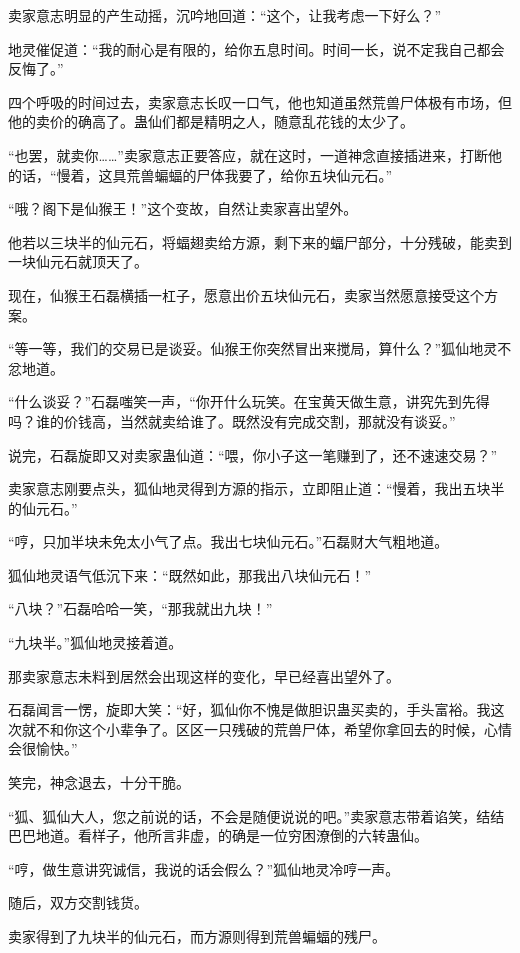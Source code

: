 \begin{this_body}
卖家意志明显的产生动摇，沉吟地回道：“这个，让我考虑一下好么？”

地灵催促道：“我的耐心是有限的，给你五息时间。时间一长，说不定我自己都会反悔了。”

四个呼吸的时间过去，卖家意志长叹一口气，他也知道虽然荒兽尸体极有市场，但他的卖价的确高了。蛊仙们都是精明之人，随意乱花钱的太少了。

“也罢，就卖你……”卖家意志正要答应，就在这时，一道神念直接插进来，打断他的话，“慢着，这具荒兽蝙蝠的尸体我要了，给你五块仙元石。”

“哦？阁下是仙猴王！”这个变故，自然让卖家喜出望外。

他若以三块半的仙元石，将蝠翅卖给方源，剩下来的蝠尸部分，十分残破，能卖到一块仙元石就顶天了。

现在，仙猴王石磊横插一杠子，愿意出价五块仙元石，卖家当然愿意接受这个方案。

“等一等，我们的交易已是谈妥。仙猴王你突然冒出来搅局，算什么？”狐仙地灵不忿地道。

“什么谈妥？”石磊嗤笑一声，“你开什么玩笑。在宝黄天做生意，讲究先到先得吗？谁的价钱高，当然就卖给谁了。既然没有完成交割，那就没有谈妥。”

说完，石磊旋即又对卖家蛊仙道：“喂，你小子这一笔赚到了，还不速速交易？”

卖家意志刚要点头，狐仙地灵得到方源的指示，立即阻止道：“慢着，我出五块半的仙元石。”

“哼，只加半块未免太小气了点。我出七块仙元石。”石磊财大气粗地道。

狐仙地灵语气低沉下来：“既然如此，那我出八块仙元石！”

“八块？”石磊哈哈一笑，“那我就出九块！”

“九块半。”狐仙地灵接着道。

那卖家意志未料到居然会出现这样的变化，早已经喜出望外了。

石磊闻言一愣，旋即大笑：“好，狐仙你不愧是做胆识蛊买卖的，手头富裕。我这次就不和你这个小辈争了。区区一只残破的荒兽尸体，希望你拿回去的时候，心情会很愉快。”

笑完，神念退去，十分干脆。

“狐、狐仙大人，您之前说的话，不会是随便说说的吧。”卖家意志带着谄笑，结结巴巴地道。看样子，他所言非虚，的确是一位穷困潦倒的六转蛊仙。

“哼，做生意讲究诚信，我说的话会假么？”狐仙地灵冷哼一声。

随后，双方交割钱货。

卖家得到了九块半的仙元石，而方源则得到荒兽蝙蝠的残尸。


\end{this_body}

